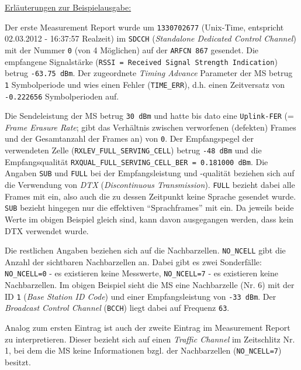 \underline{Erläuterungen zur Beispielausgabe:}

Der erste Measurement Report wurde um \verb|1330702677| (Unix-Time, entspricht 02.03.2012 - 16:37:57 Realzeit) im \verb|SDCCH| (\textit{Standalone Dedicated Control Channel}) mit der Nummer \verb|0| (von 4 Möglichen) auf der \verb|ARFCN 867| gesendet. Die empfangene Signalstärke (\verb|RSSI = Received Signal Strength Indication|) betrug \verb|-63.75 dBm|. Der zugeordnete \textit{Timing Advance} Parameter der MS betrug \verb|1| Symbolperiode und wies einen Fehler (\verb|TIME_ERR|), d.h. einen Zeitversatz von \verb|-0.222656| Symbolperioden auf.

Die Sendeleistung der MS betrug \verb|30 dBm| und hatte bis dato eine \verb|Uplink-FER| (= \textit{Frame Erasure Rate}; gibt das Verhältnis zwischen verworfenen (defekten) Frames und der Gesamtanzahl der Frames an) von \verb|0|. Der Empfangspegel der verwendeten Zelle (\verb|RXLEV_FULL_SERVING_CELL|) betrug \verb|-48 dBm| und die Empfangsqualität \verb|RXQUAL_FULL_SERVING_CELL_BER = 0.181000 dBm|. Die Angaben \verb|SUB| und \verb|FULL| bei der Empfangsleistung und -qualität beziehen sich auf die Verwendung von \textit{DTX} (\textit{Discontinuous Transmission}). \verb|FULL| bezieht dabei alle Frames mit ein, also auch die zu dessen Zeitpunkt keine Sprache gesendet wurde. \verb|SUB| bezieht hingegen nur die effektiven "`Sprachframes"' mit ein. Da jeweils beide Werte im obigen Beispiel gleich sind, kann davon ausgegangen werden, dass kein DTX verwendet wurde. 

Die restlichen Angaben beziehen sich auf die Nachbarzellen. \verb|NO_NCELL| gibt die Anzahl der sichtbaren Nachbarzellen an. Dabei gibt es zwei Sonderfälle: \verb|NO_NCELL=0| - es existieren keine Messwerte, \verb|NO_NCELL=7| - es existieren keine Nachbarzellen. Im obigen Beispiel sieht die MS eine Nachbarzelle (Nr. 6) mit der ID \verb|1| (\textit{Base Station ID Code}) und einer Empfangsleistung von \verb|-33 dBm|. Der \textit{Broadcast Control Channel} (\verb|BCCH|) liegt dabei auf Frequenz \verb|63|.

Analog zum ersten Eintrag ist auch der zweite Eintrag im Measurement Report zu interpretieren. Dieser bezieht sich auf einen \textit{Traffic Channel} im Zeitschlitz Nr. 1, bei dem die MS keine Informationen bzgl. der Nachbarzellen (\verb|NO_NCELL=7|) besitzt.